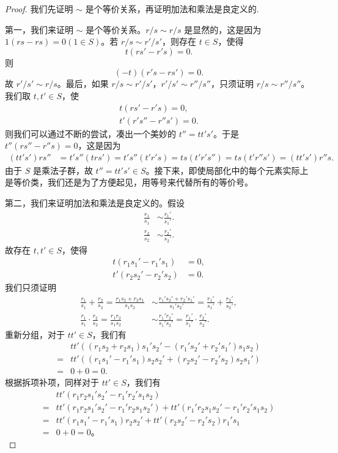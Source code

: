 \documentclass[../../main.tex]{subfiles}
\begin{document}
\begin{proof}
我们先证明 $\sim$ 是个等价关系，再证明加法和乘法是良定义的.

第一，我们来证明 $\sim$ 是个等价关系。$r/s \sim r/s$ 是显然的，这是因为 $1(rs - rs) = 0(1 \in S)$。若 $r/s \sim r'/s'$，则存在 $t \in S$，使得
\[t(rs' - r's) = 0 .\]
则
\[(-t)(r's - rs') = 0.\]
故 $r'/s' \sim r/s$。最后，如果 $r/s \sim r'/s'$，$r'/s' \sim r''/s''$，只须证明 $r/s \sim r''/s''$。我们取 $t, t' \in S$，使
\begin{gather*}
t(rs' - r's) = 0 ,\\
t'(r's'' - r''s') = 0 .
\end{gather*}
则我们可以通过不断的尝试，凑出一个美妙的 $t'' = tt's'$。于是 $t''(rs'' - r''s) = 0$，这是因为
\begin{align*}
(tt's')rs'' &= t's''(trs') = t's''(t'r's) = ts(t'r's'') = ts(t'r''s') = (tt's')r''s .
\end{align*}
由于 $S$ 是乘法子群，故 $t'' = tt's' \in S$。接下来，即使局部化中的每个元素实际上是等价类，我们还是为了方便起见，用等号来代替所有的等价号。

第二，我们来证明加法和乘法是良定义的。假设
\begin{align*}
\frac{r_1}{s_1} &\sim \frac{r_1'}{s_1'} .\\
\frac{r_2}{s_2} &\sim \frac{r_2'}{s_2'} .
\end{align*}
故存在 $t, t' \in S$，使得
\begin{align*}
t(r_1s_1' - r_1's_1) &= 0 ,\\
t'(r_2s_2' - r_2's_2) &= 0 .
\end{align*}
我们只须证明
\begin{align*}
\frac{r_1}{s_1} + \frac{r_2}{s_2} = \frac{r_1s_2 + r_2s_1}{s_1s_2} &\sim \frac{r_1's_2' + r_2's_1'}{s_1's_2'} = \frac{r_1'}{s_1'} + \frac{r_2'}{s_2'} ,\\
\frac{r_1}{s_1} \cdot \frac{r_2}{s_2} = \frac{r_1r_2}{s_1s_2} &\sim \frac{r_1'r_2'}{s_1's_2'} = \frac{r_1'}{s_1'} \cdot \frac{r_2'}{s_2'} .
\end{align*}
重新分组，对于 $tt' \in S$，我们有
\begin{align*}
&tt'\left((r_1s_2 + r_2s_1)s_1's_2' - (r_1's_2' + r_2's_1')s_1s_2\right)\\
=&tt'\left((r_1s_1' - r_1's_1)s_2s_2' + (r_2s_2' - r_2's_2)s_2s_1'\right)\\
=&0 + 0 = 0 .
\end{align*}
根据拆项补项，同样对于 $tt' \in S$，我们有
\begin{align*}
&tt'(r_1r_2s_1's_2' - r_1'r_2's_1s_2)\\
=&tt'(r_1r_2s_1's_2' - r_1'r_2s_1s_2') + tt'(r_1'r_2s_1s_2' - r_1'r_2's_1s_2)\\
=&tt'(r_1s_1' - r_1's_1)r_2s_2' + tt'(r_2s_2' - r_2's_2)r_1's_1\\
=&0 + 0 = 0 。
\end{align*}
\end{proof}
\end{document}
